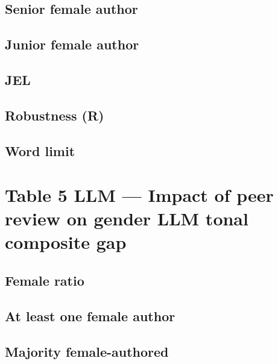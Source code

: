 \documentclass[12pt]{article}
\begin{document}
\subsection{Senior female author}

\clearpage

\subsection{Junior female author}

\clearpage

\subsection{JEL}

\clearpage

\subsection{Robustness (R)}

\clearpage

\subsection{Word limit}

\clearpage

\section{Table 5 LLM --- Impact of peer review on gender LLM tonal composite gap}

\subsection{Female ratio}

\clearpage

\subsection{At least one female author}

\clearpage

\subsection{Majority female-authored}

\clearpage
\end{document}
